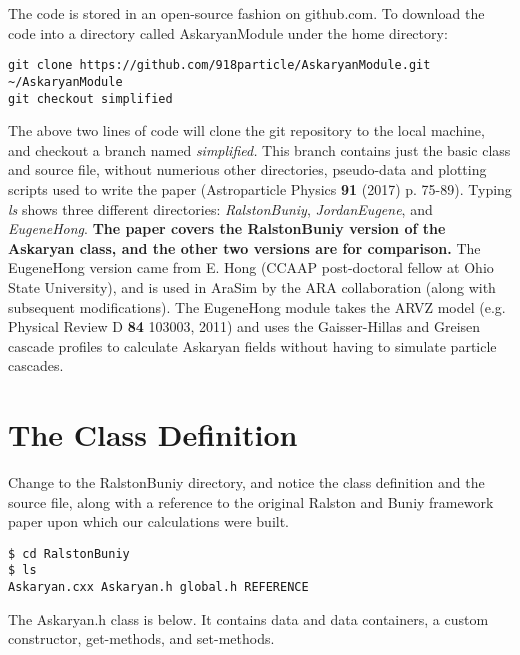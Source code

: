 \documentclass[10pt]{article}
\begin{document}
The code is stored in an open-source fashion on github.com.  To download the code into a directory called AskaryanModule under the home directory:

\begin{verbatim}
git clone https://github.com/918particle/AskaryanModule.git ~/AskaryanModule
git checkout simplified
\end{verbatim}

The above two lines of code will clone the git repository to the local machine, and checkout a branch named \textit{simplified.}  This branch contains just the basic class and source file, without numerious other directories, pseudo-data and plotting scripts used to write the paper (Astroparticle Physics \textbf{91} (2017) p. 75-89).  Typing \textit{ls} shows three different directories: \textit{RalstonBuniy}, \textit{JordanEugene}, and \textit{EugeneHong}.  \textbf{The paper covers the RalstonBuniy version of the Askaryan class, and the other two versions are for comparison.}  The EugeneHong version came from E. Hong (CCAAP post-doctoral fellow at Ohio State University), and is used in AraSim by the ARA collaboration (along with subsequent modifications).  The EugeneHong module takes the ARVZ model (e.g. Physical Review D \textbf{84} 103003, 2011) and uses the Gaisser-Hillas and Greisen cascade profiles to calculate Askaryan fields without having to simulate particle cascades.

\section{The Class Definition}

Change to the RalstonBuniy directory, and notice the class definition and the source file, along with a reference to the original Ralston and Buniy framework paper upon which our calculations were built.

\begin{verbatim}
$ cd RalstonBuniy
$ ls
Askaryan.cxx Askaryan.h global.h REFERENCE
\end{verbatim}

The Askaryan.h class is below.  It contains data and data containers, a custom constructor, get-methods, and set-methods.
\end{document}
